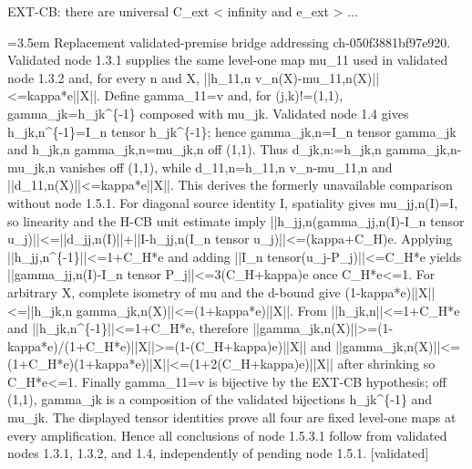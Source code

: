 \documentclass{article}
\newcommand{\step}[1]{\par\noindent\hangindent=3.5em\hangafter=1%
  \makebox[3.5em][l]{\textbf{#1.}}}
\newcommand{\steptag}[1]{\hfill{\small\textsf{[#1]}}}
\begin{document}
\begin{proofbox}{EXT-CB: there are universal C\_ext < infinity and e\_ext > ...}
\step{1.5.3.1.2} Replacement validated-premise bridge addressing ch-050f3881bf97e920. Validated node 1.3.1 supplies the same level-one map mu\_11 used in validated node 1.3.2 and, for every n and X, ||h\_11,n v\_n(X)-mu\_11,n(X)||<=kappa*e||X||. Define gamma\_11=v and, for (j,k)!=(1,1), gamma\_jk=h\_jk\textasciicircum{}\{-1\} composed with mu\_jk. Validated node 1.4 gives h\_jk,n\textasciicircum{}\{-1\}=I\_n tensor h\_jk\textasciicircum{}\{-1\}; hence gamma\_jk,n=I\_n tensor gamma\_jk and h\_jk,n gamma\_jk,n=mu\_jk,n off (1,1). Thus d\_jk,n:=h\_jk,n gamma\_jk,n-mu\_jk,n vanishes off (1,1), while d\_11,n=h\_11,n v\_n-mu\_11,n and ||d\_11,n(X)||<=kappa*e||X||. This derives the formerly unavailable comparison without node 1.5.1. For diagonal source identity I, spatiality gives mu\_jj,n(I)=I, so linearity and the H-CB unit estimate imply ||h\_jj,n(gamma\_jj,n(I)-I\_n tensor u\_j)||<=||d\_jj,n(I)||+||I-h\_jj,n(I\_n tensor u\_j)||<=(kappa+C\_H)e. Applying ||h\_jj,n\textasciicircum{}\{-1\}||<=1+C\_H*e and adding ||I\_n tensor(u\_j-P\_j)||<=C\_H*e yields ||gamma\_jj,n(I)-I\_n tensor P\_j||<=3(C\_H+kappa)e once C\_H*e<=1. For arbitrary X, complete isometry of mu and the d-bound give (1-kappa*e)||X||<=||h\_jk,n gamma\_jk,n(X)||<=(1+kappa*e)||X||. From ||h\_jk,n||<=1+C\_H*e and ||h\_jk,n\textasciicircum{}\{-1\}||<=1+C\_H*e, therefore ||gamma\_jk,n(X)||>=(1-kappa*e)/(1+C\_H*e)||X||>=(1-(C\_H+kappa)e)||X|| and ||gamma\_jk,n(X)||<=(1+C\_H*e)(1+kappa*e)||X||<=(1+2(C\_H+kappa)e)||X|| after shrinking so C\_H*e<=1. Finally gamma\_11=v is bijective by the EXT-CB hypothesis; off (1,1), gamma\_jk is a composition of the validated bijections h\_jk\textasciicircum{}\{-1\} and mu\_jk. The displayed tensor identities prove all four are fixed level-one maps at every amplification. Hence all conclusions of node 1.5.3.1 follow from validated nodes 1.3.1, 1.3.2, and 1.4, independently of pending node 1.5.1. \steptag{validated} \\[6pt]

\end{proofbox}
\end{document}
